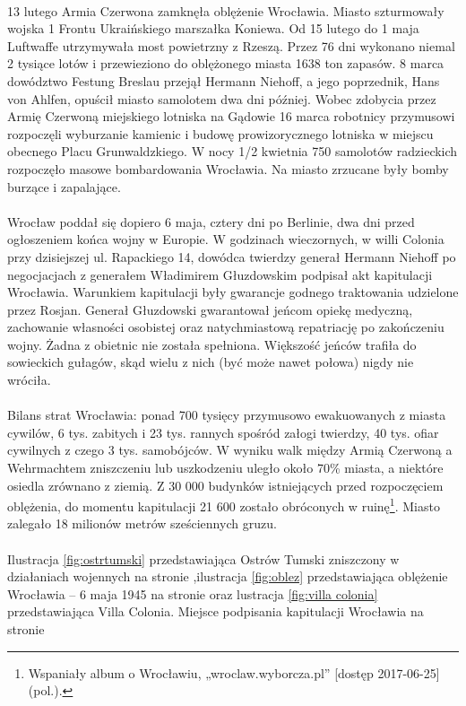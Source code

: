 \documentclass{article}
\begin{document}
\\
13 lutego Armia Czerwona zamknęła oblężenie Wrocławia. Miasto szturmowały wojska 1 Frontu Ukraińskiego marszałka Koniewa. Od 15 lutego do 1 maja Luftwaffe utrzymywała most powietrzny z Rzeszą. Przez 76 dni wykonano niemal 2 tysiące lotów i przewieziono do oblężonego miasta 1638 ton zapasów. 8 marca dowództwo Festung Breslau przejął Hermann Niehoff, a jego poprzednik, Hans von Ahlfen, opuścił miasto samolotem dwa dni później. Wobec zdobycia przez Armię Czerwoną miejskiego lotniska na Gądowie 16 marca robotnicy przymusowi rozpoczęli wyburzanie kamienic i budowę prowizorycznego lotniska w miejscu obecnego Placu Grunwaldzkiego. W nocy 1/2 kwietnia 750 samolotów radzieckich rozpoczęło masowe bombardowania Wrocławia. Na miasto zrzucane były bomby burzące i zapalające.\\
\\
Wrocław poddał się dopiero 6 maja, cztery dni po Berlinie, dwa dni przed ogłoszeniem końca wojny w Europie. W godzinach wieczornych, w willi Colonia przy dzisiejszej ul. Rapackiego 14, dowódca twierdzy generał Hermann Niehoff po negocjacjach z generałem Władimirem Głuzdowskim podpisał akt kapitulacji Wrocławia. Warunkiem kapitulacji były gwarancje godnego traktowania udzielone przez Rosjan. Generał Głuzdowski gwarantował jeńcom opiekę medyczną, zachowanie własności osobistej oraz natychmiastową repatriację po zakończeniu wojny. Żadna z obietnic nie została spełniona. Większość jeńców trafiła do sowieckich gułagów, skąd wielu z nich (być może nawet połowa) nigdy nie wróciła.\\
\\
Bilans strat Wrocławia: ponad 700 tysięcy przymusowo ewakuowanych z miasta cywilów, 6 tys. zabitych i 23 tys. rannych spośród załogi twierdzy, 40 tys. ofiar cywilnych z czego 3 tys. samobójców. W wyniku walk między Armią Czerwoną a Wehrmachtem zniszczeniu lub uszkodzeniu uległo około 70\% miasta, a niektóre osiedla zrównano z ziemią. Z 30 000 budynków istniejących przed rozpoczęciem oblężenia, do momentu kapitulacji 21 600 zostało obróconych w ruinę\footnote{ Wspaniały album o Wrocławiu, „wroclaw.wyborcza.pl” [dostęp 2017-06-25] (pol.).}. Miasto zalegało 18 milionów metrów sześciennych gruzu.\\
\\
Ilustracja \ref{fig:ostrtumski} przedstawiająca Ostrów Tumski zniszczony w działaniach wojennych na stronie \pageref{fig:ostrtumski},ilustracja \ref{fig:oblez} przedstawiająca oblężenie Wrocławia – 6 maja 1945 na stronie \pageref{fig:oblez} oraz lustracja \ref{fig:villa colonia} przedstawiająca Villa Colonia. Miejsce podpisania kapitulacji Wrocławia na stronie \pageref{fig:villa colonia}
\end{document}
